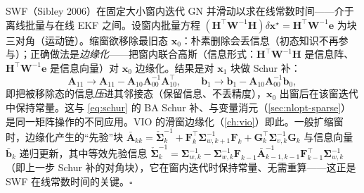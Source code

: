 \begin{derivation}[（选读）滑动窗口滤波：边缘化 $=$ Schur 补]
\label{der:nlopt-swf}
SWF（Sibley 2006\cite{sibley2010sliding}）在固定大小窗内迭代 GN 并滑动以求在线常数时间——介于离线批量与在线 EKF 之间。设窗内批量方程 $(\mathbf{H}^\top\mathbf{W}^{-1}\mathbf{H})\delta\mathbf{x}^\star=\mathbf{H}^\top\mathbf{W}^{-1}\mathbf{e}$ 为块三对角（运动链）。缩窗欲移除最旧态 $\mathbf{x}_0$：朴素删除会丢信息（初态知识不再参与）；正确做法是\emph{边缘化}——把窗内联合高斯（信息形式：$\mathbf{H}^\top\mathbf{W}^{-1}\mathbf{H}$ 是信息阵、$\mathbf{H}^\top\mathbf{W}^{-1}\mathbf{e}$ 是信息向量）对 $\mathbf{x}_0$ 边缘化。结果是对 $\mathbf{x}_1$ 块做 Schur 补：
\[
  \mathbf{A}_{11}\to\mathbf{A}_{11}-\mathbf{A}_{10}\mathbf{A}_{00}^{-1}\mathbf{A}_{10}^\top,\qquad
  \mathbf{b}_1\to\mathbf{b}_1-\mathbf{A}_{10}\mathbf{A}_{00}^{-1}\mathbf{b}_0,
\]
即把被移除态的信息\emph{压}进其邻接态（保留信息、不丢精度），$\mathbf{x}_0$ 出窗后在该窗迭代中保持常量。这与 \cref{eq:schur} 的 BA Schur 补、与变量消元（\cref{sec:nlopt-sparse}）是同一矩阵操作的不同应用。VIO 的滑窗边缘化（\cref{ch:vio}）即此。一般扩缩窗时，边缘化产生的“先验”块 $\bar{\mathbf{A}}_{kk}=\check{\boldsymbol{\Sigma}}_k^{-1}+\mathbf{F}_k^\top\boldsymbol{\Sigma}_{w,k+1}^{-1}\mathbf{F}_k+\mathbf{G}_k^\top\boldsymbol{\Sigma}_{v,k}^{-1}\mathbf{G}_k$ 与信息向量 $\bar{\mathbf{b}}_k$ 递归更新，其中等效先验信息 $\check{\boldsymbol{\Sigma}}_k^{-1}=\boldsymbol{\Sigma}_{w,k}^{-1}-\boldsymbol{\Sigma}_{w,k}^{-1}\mathbf{F}_{k-1}\bar{\mathbf{A}}_{k-1,k-1}^{-1}\mathbf{F}_{k-1}^\top\boldsymbol{\Sigma}_{w,k}^{-1}$（即上一步 Schur 补的对角块），它在窗内迭代时保持常量、无需重算——这正是 SWF 在线常数时间的关键\cite{barfoot2024state}。\hfill$\square$
\end{derivation}

